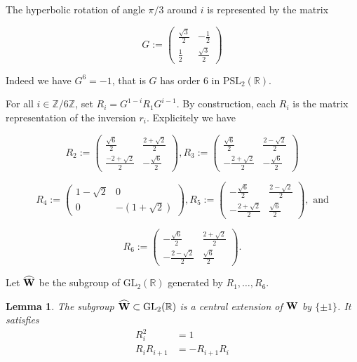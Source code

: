 \documentclass[10pt,a4paper]{amsart}
\newcommand{\R}{\mathbb{R}}
\newcommand{\Z}{\mathbb{Z}}
\newcommand{\GL}{{\mathrm {GL}}}
\newcommand{\PSL}{{\mathrm {PSL}}}
\newtheorem{lemma}{Lemma}
\begin{document}
The hyperbolic rotation of angle $\pi/3$ around $i$ 
is  represented by the matrix


$$G:=\begin{pmatrix}
\frac{\sqrt{3}}{2} & -\frac{1}{2}\\
\frac{1}{2} & \frac{\sqrt{3}}{2}
\end{pmatrix}$$

\noindent Indeed we have $G^6=-1$, that is $G$ has order $6$
in $\PSL_2(\R)$.

 For all $i\in\Z/6\Z$, set  $R_i=G^{1-i}R_1G^{i-1}$. By construction, each $R_i$ is the matrix representation of the inversion $r_i$.  Explicitely we have

$$R_2:=\begin{pmatrix}
\frac{\sqrt{6}}{2}& \frac{2+\sqrt{2}}{2}\\
\frac{-2+\sqrt{2}}{2} &-\frac{\sqrt{6}}{2}
\end{pmatrix},
R_3:=\begin{pmatrix}
\frac{\sqrt{6}}{2}& \frac{2-\sqrt{2}}{2}\\
-\frac{2+\sqrt{2}}{2} &-\frac{\sqrt{6}}{2}
\end{pmatrix}
$$

$$R_4:=\begin{pmatrix}
1-\sqrt{2} & 0\\
0 &-(1+ \sqrt{2})
\end{pmatrix},
R_5:=\begin{pmatrix}
-\frac{\sqrt{6}}{2}& \frac{2-\sqrt{2}}{2}\\
-\frac{2+\sqrt{2}}{2} &\frac{\sqrt{6}}{2}
\end{pmatrix}, \text{ and}$$


$$R_6:=\begin{pmatrix}
-\frac{\sqrt{6}}{2}& \frac{2+\sqrt{2}}{2}\\
-\frac{2-\sqrt{2}}{2} &\frac{\sqrt{6}}{2}
\end{pmatrix}.$$


Let $\widehat{\bf W}$ be the subgroup of $\GL_2(\R)$ generated by  
$R_1,\ldots,R_6$.

\begin{lemma} The subgroup $\widehat{\bf W}\subset\GL_2(\R)$  is a central extension of
$\bf{W}$ by $\{\pm 1\}$. It satisfies
\begin{align}
R_i^2&=1\label{cover1}\\
R_iR_{i+1}&=-R_{i+1}R_i\label{cover2}
\end{align}
\end{lemma}
\end{document}
